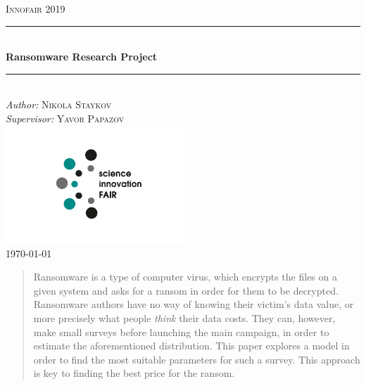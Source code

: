 \documentclass[11pt, a4paper]{article}
\theoremstyle{definition}
\begin{document}
\begin{titlepage}
	\newcommand{\HRule}{\rule{\linewidth}{0.5mm}}
	\centering
	\textsc{\LARGE Innofair 2019}\\[1cm]
	\HRule\\[1 cm]
	{\huge\bfseries Ransomware Research Project }\\[0.5 cm] 
	\HRule\\
			\vfill
			\Large
			\textit{Author:}
			\textsc{Nikola Staykov}\\
            \vspace{2cm}
			\Large
			\textit{Supervisor:}
            \textsc{Yavor Papazov}\\
            \includegraphics[width=0.5\textwidth]{Innofair_logo}\\
    \vfill	
	{\large\today}   
	\vfill
\end{titlepage}

\tableofcontents
\newpage
\begin{abstract}
		Ransomware is a type of computer virus, which encrypts the files on a given system and asks for a ransom in order for them to be decrypted. Ransomware authors have no way of knowing their victim's data value, or more precisely what people \textit{think} their data costs. They can, however, make small surveys before launching the main campaign, in order to estimate the aforementioned distribution. This paper explores a model in order to find the most suitable parameters for such a survey. This approach is key to finding the best price for the ransom.
\end{abstract}
\end{document}
